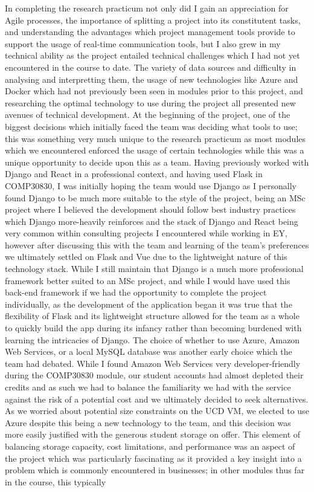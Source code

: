 \documentclass{scrreprt}
\begin{document}
\newpage
\noindent In completing the research practicum not only did I gain an appreciation for Agile processes, the importance of splitting a project into its constitutent tasks, and understanding the advantages which project management tools provide to support the usage of real-time communication tools, but I also grew in my technical ability as the project entailed technical challenges which I had not yet encountered in the course to date. The variety of data sources and difficulty in analysing and interpretting them, the usage of new technologies like Azure and Docker which had not previously been seen in modules prior to this project, and researching the optimal technology to use during the project all presented new avenues of technical development.
\newline
\newline
At the beginning of the project, one of the biggest decisions which initially faced the team was deciding what tools to use; this was something very much unique to the research practicum as most modules which we encountered enforced the usage of certain technologies while this was a unique opportunity to decide upon this as a team. Having previously worked with Django and React in a professional context, and having used Flask in COMP30830, I was initially hoping the team would use Django as I personally found Django to be much more suitable to the style of the project, being an MSc project where I believed the development should follow best industry practices which Django more-heavily reinforces and the stack of Django and React being very common within consulting projects I encountered while working in EY, however after discussing this with the team and learning of the team's preferences we ultimately settled on Flask and Vue due to the lightweight nature of this technology stack. While I still maintain that Django is a much more professional framework better suited to an MSc project, and while I would have used this back-end framework if we had the opportunity to complete the project individually, as the development of the application began it was true that the flexibility of Flask and its lightweight structure allowed for the team as a whole to quickly build the app during its infancy rather than becoming burdened with learning the intricacies of Django. The choice of whether to use Azure, Amazon Web Services, or a local MySQL database was another early choice which the team had debated. While I found Amazon Web Services very developer-friendly during the COMP30830 module, our student accounts had almost depleted their credits and as such we had to balance the familiarity we had with the service against the risk of a potential cost and we ultimately decided to seek alternatives. As we worried about potential size constraints on the UCD VM, we elected to use Azure despite this being a new technology to the team, and this decision was more easily justified with the generous student storage on offer. This element of balancing storage capacity, cost limitations, and performance was an aspect of the project which was particularly fascinating as it provided a key insight into a problem which is commonly encountered in businesses; in other modules thus far in the course, this typically 
\end{document}
